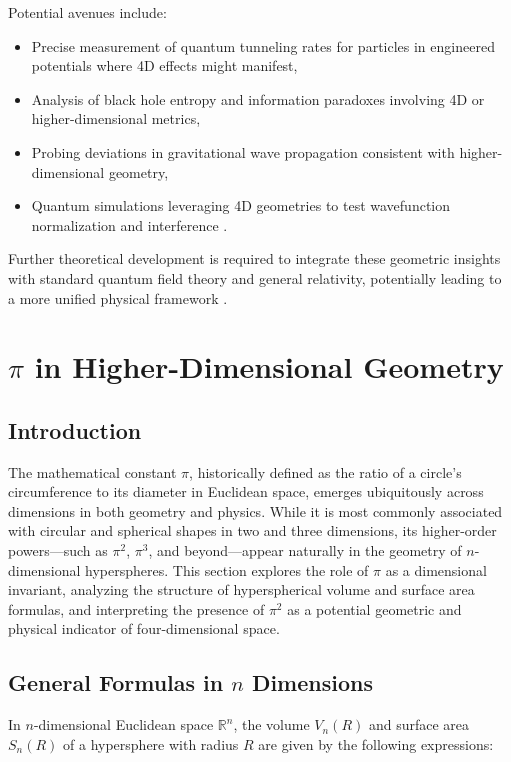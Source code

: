 \documentclass[12pt,a4paper]{article}
\begin{document}
Potential avenues include:
\begin{itemize}
\item Precise measurement of quantum tunneling rates for particles in engineered potentials where 4D effects might manifest,
\item Analysis of black hole entropy and information paradoxes involving 4D or higher-dimensional metrics,
\item Probing deviations in gravitational wave propagation consistent with higher-dimensional geometry,
\item Quantum simulations leveraging 4D geometries to test wavefunction normalization and interference \cite{price_simulating_2022}.
\end{itemize}

Further theoretical development is required to integrate these geometric insights with standard quantum field theory and general relativity, potentially leading to a more unified physical framework \cite{bostick_codes_2024}.



\section{\(\pi\) in Higher-Dimensional Geometry}

\subsection{Introduction}

The mathematical constant \(\pi\), historically defined as the ratio of a circle’s circumference to its diameter in Euclidean space, emerges ubiquitously across dimensions in both geometry and physics. While it is most commonly associated with circular and spherical shapes in two and three dimensions, its higher-order powers—such as \(\pi^2\), \(\pi^3\), and beyond—appear naturally in the geometry of \(n\)-dimensional hyperspheres. This section explores the role of \(\pi\) as a dimensional invariant, analyzing the structure of hyperspherical volume and surface area formulas, and interpreting the presence of \(\pi^2\) as a potential geometric and physical indicator of four-dimensional space.

\subsection{General Formulas in \(n\) Dimensions}

In \(n\)-dimensional Euclidean space \(\mathbb{R}^n\), the volume \(V_n(R)\) and surface area \(S_n(R)\) of a hypersphere with radius \(R\) are given by the following expressions:
\end{document}
